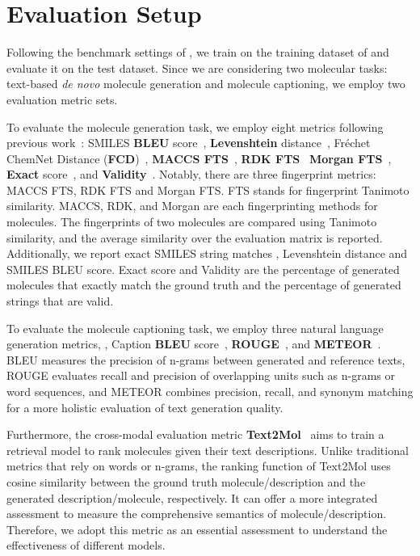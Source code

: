 \section{Evaluation Setup}
\label{sec:appendix_evaluation}

Following the benchmark settings of \olddataset, we train \newmodel on the training dataset of \newdataset and evaluate it on the test dataset. 
% 
Since we are considering two molecular tasks: text-based \emph{de novo} molecule generation and molecule captioning, we employ two evaluation metric sets. 
 
To evaluate the molecule generation task, we employ eight metrics following previous work~\cite{ELRHCJ22}: SMILES \textbf{BLEU} score~\cite{PRWZ02}, \textbf{Levenshtein} distance~\cite{MVM09}, Fréchet ChemNet Distance (\textbf{FCD})~\cite{PRUHK18}, \textbf{MACCS FTS}~\cite{DLHN02}, \textbf{RDK FTS}~\cite{SSL15} \textbf{Morgan FTS}~\cite{RH10}, \textbf{Exact} score~\cite{ELRHCJ22}, and \textbf{Validity}~\cite{ELRHCJ22}.
% 
Notably, there are three fingerprint metrics: MACCS FTS, RDK FTS and Morgan FTS. 
FTS stands for fingerprint Tanimoto similarity. 
MACCS, RDK, and Morgan are each fingerprinting methods for molecules. 
The fingerprints of two molecules are compared using Tanimoto similarity, and the average similarity over the evaluation matrix is reported. 
Additionally, we report exact SMILES string matches \ie, Levenshtein distance and SMILES BLEU score. 
Exact score and Validity are the percentage of generated molecules that exactly match the ground truth and the percentage of generated strings that are valid.

To evaluate the molecule captioning task, we employ three natural language generation metrics, \eg, Caption \textbf{BLEU} score~\cite{PRWZ02}, \textbf{ROUGE}~\cite{L04}, and \textbf{METEOR}~\cite{BL05}. 
BLEU measures the precision of n-grams between generated and reference texts, ROUGE evaluates recall and precision of overlapping units such as n-grams or word sequences, and METEOR combines precision, recall, and synonym matching for a more holistic evaluation of text generation quality.

Furthermore, the cross-modal evaluation metric \textbf{Text2Mol}~\cite{EZJ21} aims to train a retrieval model to rank molecules given their text descriptions. 
Unlike traditional metrics that rely on words or n-grams, the ranking function of Text2Mol uses cosine similarity between the ground truth molecule/description and the generated description/molecule, respectively. 
It can offer a more integrated assessment to measure the comprehensive semantics of molecule/description. 
Therefore, we adopt this metric as an essential assessment to understand the effectiveness of different models. 

